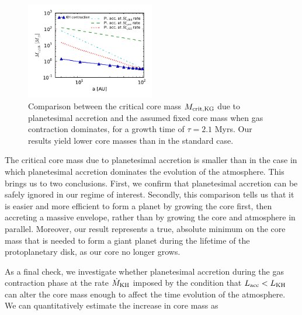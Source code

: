 \documentclass[apj]{emulateapj}
\begin{document}
 \begin{figure}[h]
\centering
\includegraphics[width=0.5\textwidth]{../../figs/ModelAtmospheres/RadSelfGravRealEOS/PaperFigs/Mc_vs_a_poly_comp.pdf}
\caption{Comparison between the critical core mass $M_{\rm{crit, KG}}$ due to planetesimal accretion and the assumed fixed core mass when gas contraction dominates, for a growth time of $\tau=2.1$ Myrs. Our results yield lower core masses than in the standard case.}
\label{fig:raf2}
\end{figure}

The critical core mass due to planetesimal accretion is smaller than in the case in which planetesimal accretion dominates the evolution of the atmosphere. This brings us to two conclusions. First, we confirm that planetesimal accretion can be safely ignored in our regime of interest. Secondly, this comparison tells us that it is easier and more efficient to form a planet by growing the core first, then accreting a massive envelope, rather than by growing the core and atmosphere in parallel. Moreover, our result represents a true, absolute minimum on the core mass that is needed to form a giant planet during the lifetime of the protoplanetary disk, as our core no longer grows.



As a final check, we investigate whether planetesimal accretion during the gas contraction phase at the rate $\dot{M}_{\rm{KH}}$ imposed by the condition that $L_{\rm{acc}}<L_{\rm{KH}}$ can alter the core mass enough to affect the time evolution of the atmosphere. We can quantitatively estimate the increase in core mass as 
\end{document}
